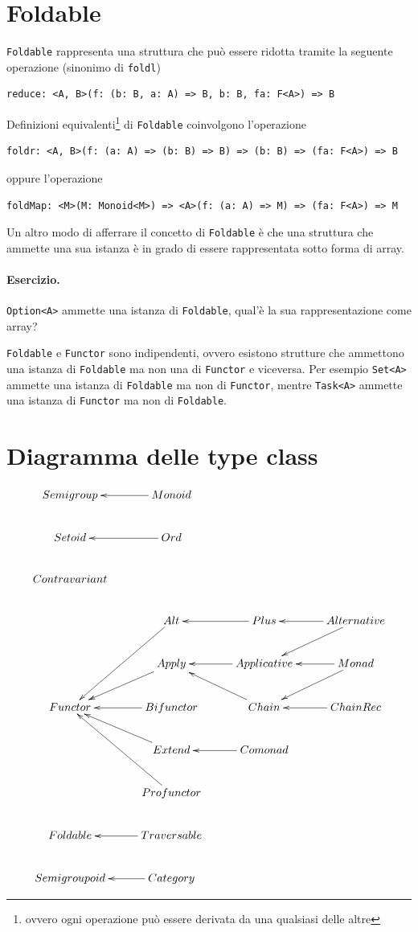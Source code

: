\documentclass[12pt]{article}
\begin{document}
\section{Foldable}

\texttt{Foldable} rappresenta una struttura che può essere ridotta tramite la seguente operazione (sinonimo di \texttt{foldl})

\begin{verbatim}
reduce: <A, B>(f: (b: B, a: A) => B, b: B, fa: F<A>) => B
\end{verbatim}

Definizioni equivalenti\footnote{ovvero ogni operazione può essere derivata da una qualsiasi delle altre} di \texttt{Foldable} coinvolgono l'operazione

\begin{verbatim}
foldr: <A, B>(f: (a: A) => (b: B) => B) => (b: B) => (fa: F<A>) => B
\end{verbatim}

oppure l'operazione

\begin{verbatim}
foldMap: <M>(M: Monoid<M>) => <A>(f: (a: A) => M) => (fa: F<A>) => M
\end{verbatim}

Un altro modo di afferrare il concetto di \texttt{Foldable} è che una struttura che ammette una sua istanza
è in grado di essere rappresentata sotto forma di array.

\paragraph{Esercizio.} \texttt{Option<A>} ammette una istanza di \texttt{Foldable}, qual'è la sua rappresentazione come array?

\texttt{Foldable} e \texttt{Functor} sono indipendenti, ovvero esistono strutture che ammettono una istanza di \texttt{Foldable} ma non una di
\texttt{Functor} e viceversa. Per esempio \texttt{Set<A>} ammette una istanza di \texttt{Foldable} ma non di \texttt{Functor},
mentre \texttt{Task<A>} ammette una istanza di \texttt{Functor} ma non di \texttt{Foldable}.

\section{Diagramma delle type class}

\[
\xymatrix{
  Semigroup & Monoid \ar[l] \\
  Setoid & Ord \ar[l] \\
  Contravariant \\
  & Alt \ar[ldd] & Plus \ar[l] & Alternative \ar[l] \ar[ld] \\
  & Apply \ar[ld] & Applicative \ar[l] & Monad \ar[l] \ar[ld] \\
  Functor & Bifunctor \ar[l] & Chain \ar[lu] & ChainRec \ar[l] \\
  & Extend \ar[lu] & Comonad \ar[l] \\
  & Profunctor \ar[luu] \\
  Foldable & Traversable \ar[l] \\
  Semigroupoid & Category \ar[l] \\
}
\]
\end{document}

